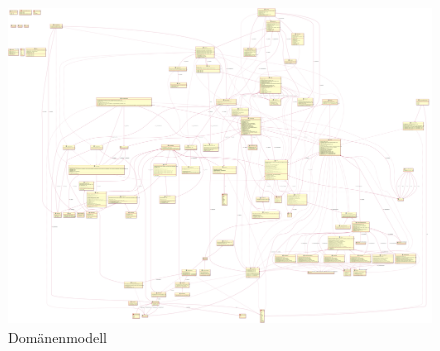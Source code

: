 \documentclass{article}
\begin{document}
\begin{figure}[ht]
  \hspace{-4.5cm}
  \includegraphics[width=0.95\paperwidth]{config_class.png}
  \caption{Domänenmodell}
  \label{fig:domain}
\end{figure}

\end{document}
